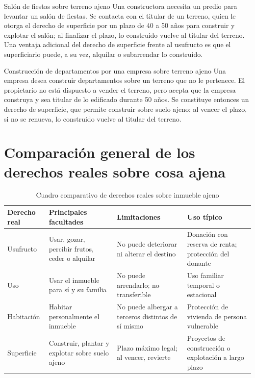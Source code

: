 \documentclass[12pt,oneside]{book}
\begin{document}
\begin{example}{Salón de fiestas sobre terreno ajeno}
Una constructora necesita un predio para levantar un salón de fiestas. Se contacta con el titular de un terreno, quien le otorga el derecho de superficie por un plazo de 40 a 50 años para construir y explotar el salón; al finalizar el plazo, lo construido vuelve al titular del terreno. Una ventaja adicional del derecho de superficie frente al usufructo es que el superficiario puede, a su vez, alquilar o subarrendar lo construido.
\end{example}

\begin{example}{Construcción de departamentos por una empresa sobre terreno ajeno}
Una empresa desea construir departamentos sobre un terreno que no le pertenece. El propietario no está dispuesto a vender el terreno, pero acepta que la empresa construya y sea titular de lo edificado durante 50 años. Se constituye entonces un derecho de superficie, que permite construir sobre suelo ajeno; al vencer el plazo, si no se renueva, lo construido vuelve al titular del terreno.
\end{example}

\section{Comparación general de los derechos reales sobre cosa ajena}

\begin{table}[H]
\centering
\caption{Cuadro comparativo de derechos reales sobre inmueble ajeno}
\begin{tabularx}{\textwidth}{>{\raggedright\arraybackslash}X >{\raggedright\arraybackslash}X >{\raggedright\arraybackslash}X >{\raggedright\arraybackslash}X}
\toprule
\textbf{Derecho real} & \textbf{Principales facultades} & \textbf{Limitaciones} & \textbf{Uso típico} \\
\midrule
Usufructo & Usar, gozar, percibir frutos, ceder o alquilar & No puede deteriorar ni alterar el destino & Donación con reserva de renta; protección del donante \\
Uso & Usar el inmueble para sí y su familia & No puede arrendarlo; no transferible & Uso familiar temporal o estacional \\
Habitación & Habitar personalmente el inmueble & No puede albergar a terceros distintos de sí mismo & Protección de vivienda de persona vulnerable \\
Superficie & Construir, plantar y explotar sobre suelo ajeno & Plazo máximo legal; al vencer, revierte & Proyectos de construcción o explotación a largo plazo \\
\bottomrule
\end{tabularx}
\end{table}
\end{document}
